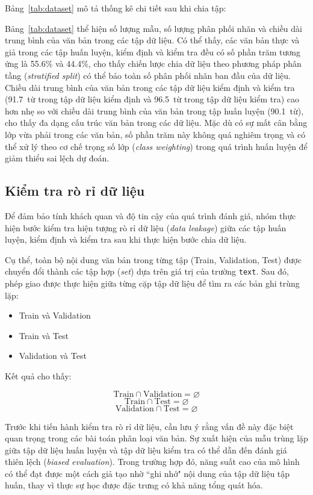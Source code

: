 \documentclass[12pt, a4paper]{report}
\newcommand{\pctReal}{55.6}              %
\newcommand{\pctFake}{44.4}              %
\newcommand{\avgLenTrain}{90.1}
\newcommand{\avgLenVal}{91.7}
\newcommand{\avgLenTest}{96.5}
\begin{document}
Bảng~\ref{tab:dataset} mô tả thống kê chi tiết sau khi chia tập:

Bảng~\ref{tab:dataset} thể hiện số lượng mẫu, số lượng phân phối nhãn và chiều dài trung bình của văn bản trong các tập dữ liệu. Có thể thấy, các văn bản thực và giả trong các tập huấn luyện, kiểm định và kiểm tra đều có số phần trăm tương ứng là \pctReal\% và \pctFake\%, cho thấy chiến lược chia dữ liệu theo phương pháp phân tầng (\textit{stratified split}) có thể bảo toàn số phân phối nhãn ban đầu của dữ liệu. Chiều dài trung bình của văn bản trong các tập dữ liệu kiểm định và kiểm tra (\avgLenVal\ từ trong tập dữ liệu kiểm định và \avgLenTest\ từ trong tập dữ liệu kiểm tra) cao hơn nhẹ so với chiều dài trung bình của văn bản trong tập huấn luyện (\avgLenTrain\ từ), cho thấy đa dạng cấu trúc văn bản trong các dữ liệu. Mặc dù có sự mất cân bằng lớp vừa phải trong các văn bản, số phần trăm này không quá nghiêm trọng và có thể xử lý theo cơ chế trọng số lớp (\textit{class weighting}) trong quá trình huấn luyện để giảm thiểu sai lệch dự đoán.

\subsection{Kiểm tra rò rỉ dữ liệu}
Để đảm bảo tính khách quan và độ tin cậy của quá trình đánh giá, nhóm thực hiện bước kiểm tra hiện tượng rò rỉ dữ liệu (\textit{data leakage}) giữa các tập huấn luyện, kiểm định và kiểm tra sau khi thực hiện bước chia dữ liệu.

Cụ thể, toàn bộ nội dung văn bản trong từng tập (Train, Validation, Test) được chuyển đổi thành các tập hợp (\textit{set}) dựa trên giá trị của trường \texttt{text}. Sau đó, phép giao được thực hiện giữa từng cặp tập dữ liệu để tìm ra các bản ghi trùng lặp:

\begin{itemize}
    \item Train và Validation
    \item Train và Test
    \item Validation và Test
\end{itemize}

Kết quả cho thấy:

\[
\text{Train} \cap \text{Validation} = \varnothing
\]
\[
\text{Train} \cap \text{Test} = \varnothing
\]
\[
\text{Validation} \cap \text{Test} = \varnothing
\]

Trước khi tiến hành kiểm tra rò rỉ dữ liệu, cần lưu ý rằng vấn đề này đặc biệt quan trọng trong các bài toán phân loại văn bản. Sự xuất hiện của mẫu trùng lặp giữa tập dữ liệu huấn luyện và tập dữ liệu kiểm tra có thể dẫn đến đánh giá thiên lệch (\textit{biased evaluation}). Trong trường hợp đó, năng suất cao của mô hình có thể đạt được một cách giả tạo nhờ ``ghi nhớ" nội dung của tập dữ liệu tập huấn, thay vì thực sự học được đặc trưng có khả năng tổng quát hóa.
\end{document}
